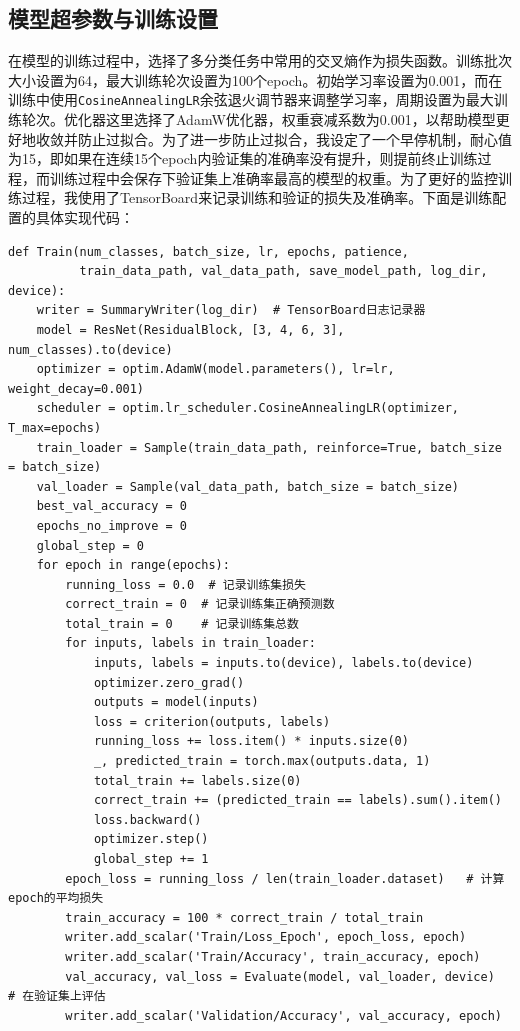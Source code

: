 \documentclass[11pt]{article}
\begin{document}
	\subsection{模型超参数与训练设置}
	在模型的训练过程中，选择了多分类任务中常用的交叉熵作为损失函数。训练批次大小设置为64，最大训练轮次设置为100个epoch。初始学习率设置为0.001，而在训练中使用\lstinline|CosineAnnealingLR|余弦退火调节器来调整学习率，周期设置为最大训练轮次。优化器这里选择了AdamW优化器，权重衰减系数为0.001，以帮助模型更好地收敛并防止过拟合。为了进一步防止过拟合，我设定了一个早停机制，耐心值为15，即如果在连续15个epoch内验证集的准确率没有提升，则提前终止训练过程，而训练过程中会保存下验证集上准确率最高的模型的权重。为了更好的监控训练过程，我使用了TensorBoard来记录训练和验证的损失及准确率。下面是训练配置的具体实现代码：
	\begin{lstlisting}
def Train(num_classes, batch_size, lr, epochs, patience,
          train_data_path, val_data_path, save_model_path, log_dir, device):
    writer = SummaryWriter(log_dir)  # TensorBoard日志记录器
    model = ResNet(ResidualBlock, [3, 4, 6, 3], num_classes).to(device)
    optimizer = optim.AdamW(model.parameters(), lr=lr, weight_decay=0.001)
    scheduler = optim.lr_scheduler.CosineAnnealingLR(optimizer, T_max=epochs)
    train_loader = Sample(train_data_path, reinforce=True, batch_size = batch_size)
    val_loader = Sample(val_data_path, batch_size = batch_size)
    best_val_accuracy = 0
    epochs_no_improve = 0
    global_step = 0
    for epoch in range(epochs):
        running_loss = 0.0  # 记录训练集损失
        correct_train = 0  # 记录训练集正确预测数
        total_train = 0    # 记录训练集总数
        for inputs, labels in train_loader:
            inputs, labels = inputs.to(device), labels.to(device)
            optimizer.zero_grad()
            outputs = model(inputs)
            loss = criterion(outputs, labels)
            running_loss += loss.item() * inputs.size(0)
            _, predicted_train = torch.max(outputs.data, 1)
            total_train += labels.size(0)
            correct_train += (predicted_train == labels).sum().item()
            loss.backward()
            optimizer.step()
            global_step += 1
        epoch_loss = running_loss / len(train_loader.dataset)   # 计算epoch的平均损失
        train_accuracy = 100 * correct_train / total_train
        writer.add_scalar('Train/Loss_Epoch', epoch_loss, epoch)
        writer.add_scalar('Train/Accuracy', train_accuracy, epoch)
        val_accuracy, val_loss = Evaluate(model, val_loader, device)    # 在验证集上评估
        writer.add_scalar('Validation/Accuracy', val_accuracy, epoch)

\end{lstlisting}
\end{document}
